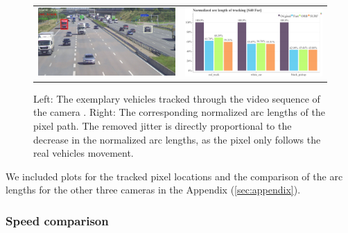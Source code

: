 \begin{figure}[!ht]
    \centering
    \begin{tabular}{cc}
      \includegraphics[width=0.475\linewidth]{diagrams/object_tracking/s40_n_far/frame_cropped.png}    &  
      \includegraphics[width=0.475\linewidth]{diagrams/object_tracking/s40_n_far/arcs.png}    
    \end{tabular}
    \caption{Left: 
    The exemplary vehicles tracked through the video sequence of the camera . 
    Right:
    The corresponding normalized arc lengths of the pixel path. 
    The removed jitter is directly proportional to the decrease in the normalized arc lengths, as the pixel only follows the real vehicles movement.
    }
    \label{fig:object_tracking_s40_n_far}
\end{figure}

We included plots for the tracked pixel locations and the comparison of the arc lengths for the other three cameras in the Appendix (\autoref{sec:appendix}).

\subsubsection{Speed comparison}